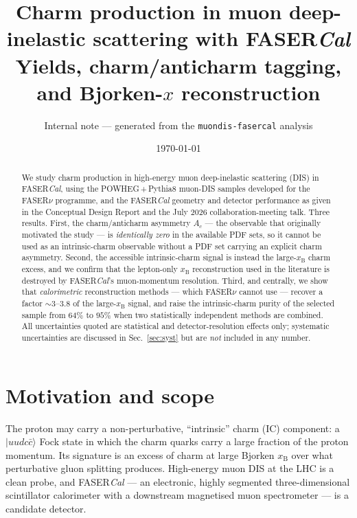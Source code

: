 \documentclass[11pt,a4paper]{article}
\title{\bf Charm production in muon deep-inelastic scattering with FASER\emph{Cal}\\[4pt]
\large Yields, charm/anticharm tagging, and Bjorken-$x$ reconstruction}
\author{Internal note --- generated from the \texttt{muondis-fasercal} analysis}
\date{\today}
\newcommand{\xB}{x_{\mathrm{B}}}
\begin{document}
\maketitle

\begin{abstract}
\noindent
We study charm production in high-energy muon deep-inelastic scattering (DIS) in
FASER\emph{Cal}, using the POWHEG\,+\,Pythia8 muon-DIS samples developed for the
FASER$\nu$ programme, and the FASER\emph{Cal} geometry and detector performance
as given in the Conceptual Design Report and the July 2026 collaboration-meeting
talk. Three results. First, the charm/anticharm asymmetry $A_c$ --- the
observable that originally motivated the study --- is \emph{identically zero} in
the available PDF sets, so it cannot be used as an intrinsic-charm observable
without a PDF set carrying an explicit charm asymmetry. Second, the accessible
intrinsic-charm signal is instead the large-$\xB$ charm excess, and we confirm
that the lepton-only $\xB$ reconstruction used in the literature is destroyed by
FASER\emph{Cal}'s muon-momentum resolution. Third, and centrally, we show that
\emph{calorimetric} reconstruction methods --- which FASER$\nu$ cannot use ---
recover a factor $\sim\!3$--$3.8$ of the large-$\xB$ signal, and raise the
intrinsic-charm purity of the selected sample from $64\%$ to $95\%$ when two
statistically independent methods are combined. All uncertainties quoted are
statistical and detector-resolution effects only; systematic uncertainties are
discussed in Sec.~\ref{sec:syst} but are \emph{not} included in any number.
\end{abstract}

\tableofcontents

\section{Motivation and scope}

The proton may carry a non-perturbative, ``intrinsic'' charm (IC) component: a
$|uudc\bar{c}\rangle$ Fock state in which the charm quarks carry a large fraction
of the proton momentum. Its signature is an excess of charm at large Bjorken
$\xB$ over what perturbative gluon splitting produces. High-energy muon DIS at
the LHC is a clean probe, and FASER\emph{Cal} --- an electronic, highly
segmented three-dimensional scintillator calorimeter with a downstream
magnetised muon spectrometer --- is a candidate detector.
\end{document}
